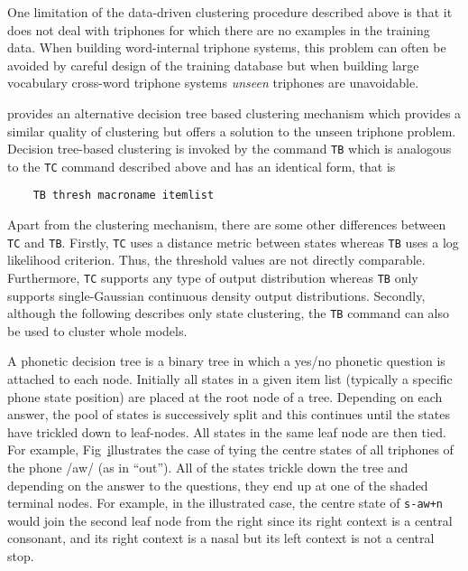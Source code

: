 
One limitation of the data-driven clustering procedure described above is
that it does not deal with triphones for which there are no examples in the
training data.  When building word-internal triphone systems,  this 
problem can often
be avoided by careful design of the training database but when building large
vocabulary cross-word triphone systems \textit{unseen} triphones are unavoidable.


 provides an alternative decision 
tree based clustering mechanism
which provides a similar quality of clustering but offers a solution 
to the unseen triphone problem.  Decision tree-based clustering is invoked
by the command \texttt{TB} which is analogous to the \texttt{TC} command
described above and has an identical form, that is
\begin{verbatim}
    TB thresh macroname itemlist
\end{verbatim}
Apart from the clustering mechanism, there are some other differences between
\texttt{TC} and \texttt{TB}.  Firstly, \texttt{TC} uses a distance metric between
states whereas \texttt{TB} uses a log likelihood criterion.  Thus, the threshold
values are not directly comparable.  Furthermore, \texttt{TC} supports any type
of output distribution whereas \texttt{TB} only supports single-Gaussian
continuous density output distributions.
Secondly, although the following describes only state clustering, 
the \texttt{TB} command can also be used to cluster whole
models.

A phonetic decision tree is a binary tree in which a yes/no phonetic 
question
is attached to each node.  
Initially all states in a given item list (typically a specific phone state position)
are placed at the
root node of a tree. Depending on each answer, the pool of states is
successively split and this continues until the states have trickled
down to leaf-nodes.  All states in the same leaf node are then tied. 
For example, Fig~\href{f:qstree} illustrates the case of tying the centre
states of all triphones of the phone /aw/ (as in ``out'').  All of the states trickle
down the tree and depending on the answer to the questions, they end up
at one of the shaded terminal nodes.   For example, in the illustrated
case, the centre state of \texttt{s-aw+n} would join the second leaf
node from the right since its right context is a central consonant,
and its right
context is a nasal  but its left context is not a central stop.

